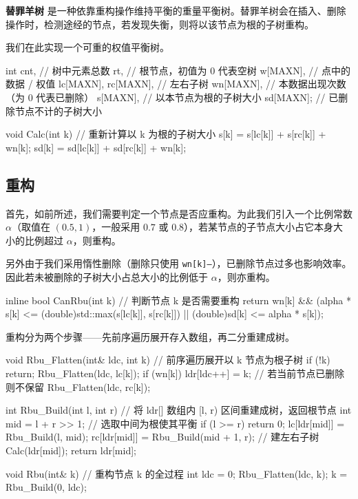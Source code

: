 
\textbf{ 替罪羊树 } 是一种依靠重构操作维持平衡的重量平衡树。替罪羊树会在插入、删除操作时，检测途经的节点，若发现失衡，则将以该节点为根的子树重构。

我们在此实现一个可重的权值平衡树。

\begin{cppcode}
int cnt,                 // 树中元素总数
    rt,                  // 根节点，初值为 0 代表空树
    w[MAXN],             // 点中的数据 / 权值
    lc[MAXN], rc[MAXN],  // 左右子树
    wn[MAXN],            // 本数据出现次数（为 0 代表已删除）
    s[MAXN],             // 以本节点为根的子树大小
    sd[MAXN];            // 已删除节点不计的子树大小

void Calc(int k) {
  // 重新计算以 k 为根的子树大小
  s[k] = s[lc[k]] + s[rc[k]] + wn[k];
  sd[k] = sd[lc[k]] + sd[rc[k]] + wn[k];
}
\end{cppcode}

\subsection{重构}

首先，如前所述，我们需要判定一个节点是否应重构。为此我们引入一个比例常数 $\alpha$（取值在 $(0.5,1)$，一般采用 $0.7$ 或 $0.8$），若某节点的子节点大小占它本身大小的比例超过 $\alpha$，则重构。

另外由于我们采用惰性删除（删除只使用 \texttt{wn[k]--}），已删除节点过多也影响效率。因此若未被删除的子树大小占总大小的比例低于 $\alpha$，则亦重构。

\begin{cppcode}
inline bool CanRbu(int k) {
  // 判断节点 k 是否需要重构
  return wn[k] && (alpha * s[k] <= (double)std::max(s[lc[k]], s[rc[k]]) ||
                   (double)sd[k] <= alpha * s[k]);
}
\end{cppcode}

重构分为两个步骤——先前序遍历展开存入数组，再二分重建成树。

\begin{cppcode}
void Rbu_Flatten(int& ldc, int k) {
  // 前序遍历展开以 k 节点为根子树
  if (!k) return;
  Rbu_Flatten(ldc, lc[k]);
  if (wn[k]) ldr[ldc++] = k;
  // 若当前节点已删除则不保留
  Rbu_Flatten(ldc, rc[k]);
}

int Rbu_Build(int l, int r) {
  // 将 ldr[] 数组内 [l, r) 区间重建成树，返回根节点
  int mid = l + r >> 1;  // 选取中间为根使其平衡
  if (l >= r) return 0;
  lc[ldr[mid]] = Rbu_Build(l, mid);
  rc[ldr[mid]] = Rbu_Build(mid + 1, r);  // 建左右子树
  Calc(ldr[mid]);
  return ldr[mid];
}

void Rbu(int& k) {
  // 重构节点 k 的全过程
  int ldc = 0;
  Rbu_Flatten(ldc, k);
  k = Rbu_Build(0, ldc);
}
\end{cppcode}

